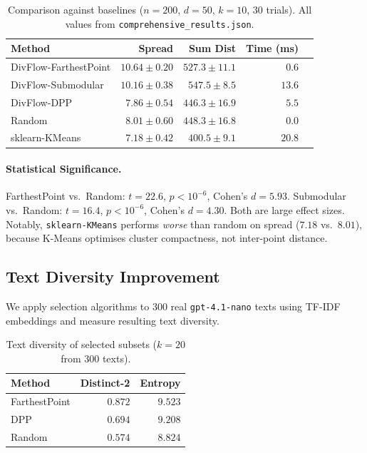 \documentclass[11pt]{article}
\begin{document}
\begin{table}[t]
\centering
\small
\caption{Comparison against baselines ($n=200$, $d=50$, $k=10$, 30 trials).
All values from \texttt{comprehensive\_results.json}.}
\label{tab:baselines}
\begin{tabular}{lrrrr}
\toprule
Method & Spread & Sum Dist & Time (ms) \\
\midrule
DivFlow-FarthestPoint & $\mathbf{10.64 \pm 0.20}$ & $527.3 \pm 11.1$ & $0.6$ \\
DivFlow-Submodular    & $10.16 \pm 0.38$ & $\mathbf{547.5 \pm 8.5}$ & $13.6$ \\
DivFlow-DPP           & $7.86 \pm 0.54$ & $446.3 \pm 16.9$ & $5.5$ \\
Random                & $8.01 \pm 0.60$ & $448.3 \pm 16.8$ & $0.0$ \\
sklearn-KMeans        & $7.18 \pm 0.42$ & $400.5 \pm 9.1$ & $20.8$ \\
\bottomrule
\end{tabular}
\end{table}

\paragraph{Statistical Significance.}
FarthestPoint vs.\ Random: $t = 22.6$, $p < 10^{-6}$, Cohen's $d = 5.93$.
Submodular vs.\ Random: $t = 16.4$, $p < 10^{-6}$, Cohen's $d = 4.30$.
Both are large effect sizes. Notably, \texttt{sklearn-KMeans} performs
\emph{worse} than random on spread ($7.18$ vs.\ $8.01$), because
K-Means optimises cluster compactness, not inter-point distance.

\subsection{Text Diversity Improvement}

We apply selection algorithms to 300 real \texttt{gpt-4.1-nano} texts
using TF-IDF embeddings and measure resulting text diversity.

\begin{table}[t]
\centering
\small
\caption{Text diversity of selected subsets ($k=20$ from 300 texts).}
\label{tab:textdiv}
\begin{tabular}{lrr}
\toprule
Method & Distinct-2 & Entropy \\
\midrule
FarthestPoint & $\mathbf{0.872}$ & $\mathbf{9.523}$ \\
DPP           & $0.694$ & $9.208$ \\
Random        & $0.574$ & $8.824$ \\
\bottomrule
\end{tabular}
\end{table}
\end{document}
